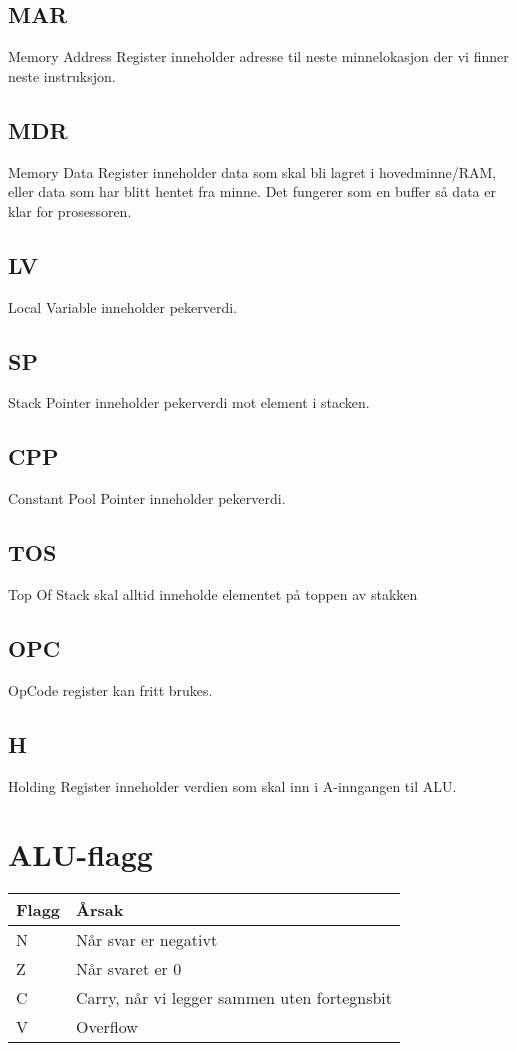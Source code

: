 \documentclass[a4paper, 10pt]{article}
\begin{document}
\subsection{MAR}
Memory Address Register inneholder adresse til neste minnelokasjon der vi finner neste instruksjon.

\subsection{MDR}
Memory Data Register inneholder data som skal bli lagret i hovedminne/RAM, eller data som har blitt hentet fra minne. Det fungerer som en buffer så data er klar for prosessoren.

\subsection{LV}
Local Variable inneholder pekerverdi.

\subsection{SP}
Stack Pointer inneholder pekerverdi mot element i stacken.

\subsection{CPP}
Constant Pool Pointer inneholder pekerverdi.

\subsection{TOS}
Top Of Stack skal alltid inneholde elementet på toppen av stakken

\subsection{OPC}
OpCode register kan fritt brukes.

\subsection{H}
Holding Register inneholder verdien som skal inn i A-inngangen til ALU.

\section{ALU-flagg}
\begin{tabular}{|l|l|}
    \hline
    Flagg & Årsak                                        \\ \hline
    N     & Når svar er negativt                         \\ \hline
    Z     & Når svaret er 0                              \\ \hline
    C     & Carry, når vi legger sammen uten fortegnsbit \\ \hline
    V     & Overflow                                     \\ \hline
\end{tabular}
\end{document}
